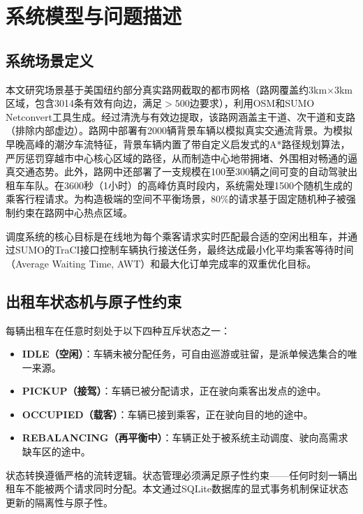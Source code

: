 \documentclass[conference]{IEEEtran}
\begin{document}
\section{系统模型与问题描述}

\subsection{系统场景定义}
本文研究场景基于美国纽约部分真实路网截取的都市网格（路网覆盖约3km\(\times\)3km区域，包含3014条有效有向边，满足\(>500\)边要求），利用OSM和SUMO Netconvert工具生成。经过清洗与有效边提取，该路网涵盖主干道、次干道和支路（排除内部虚边）。路网中部署有2000辆背景车辆以模拟真实交通流背景。为模拟早晚高峰的潮汐车流特征，背景车辆内置了带自定义启发式的A*路径规划算法，严厉惩罚穿越市中心核心区域的路径，从而制造中心地带拥堵、外围相对畅通的逼真交通态势。此外，路网中还部署了一支规模在100至300辆之间可变的自动驾驶出租车车队。在3600秒（1小时）的高峰仿真时段内，系统需处理1500个随机生成的乘客行程请求。为构造极端的空间不平衡场景，80\%的请求基于固定随机种子被强制约束在路网中心热点区域。

调度系统的核心目标是在线地为每个乘客请求实时匹配最合适的空闲出租车，并通过SUMO的TraCI接口控制车辆执行接送任务，最终达成最小化平均乘客等待时间（Average Waiting Time, AWT）和最大化订单完成率的双重优化目标。

\subsection{出租车状态机与原子性约束}
每辆出租车在任意时刻处于以下四种互斥状态之一：
\begin{itemize}
    \item \textbf{IDLE（空闲）}：车辆未被分配任务，可自由巡游或驻留，是派单候选集合的唯一来源。
    \item \textbf{PICKUP（接驾）}：车辆已被分配请求，正在驶向乘客出发点的途中。
    \item \textbf{OCCUPIED（载客）}：车辆已接到乘客，正在驶向目的地的途中。
    \item \textbf{REBALANCING（再平衡中）}：车辆正处于被系统主动调度、驶向高需求缺车区的途中。
\end{itemize}
状态转换遵循严格的流转逻辑。状态管理必须满足原子性约束——任何时刻一辆出租车不能被两个请求同时分配。本文通过SQLite数据库的显式事务机制保证状态更新的隔离性与原子性。
\end{document}
